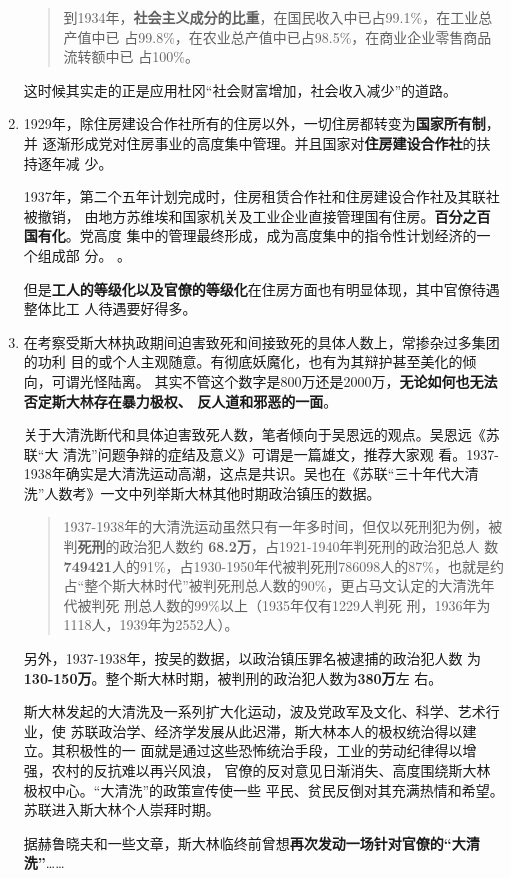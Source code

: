 \begin{enumerate}
\begin{quotation}
    到1934年，\textbf{社会主义成分的比重}，在国民收入中已占99.1\%，在工业总产值中已
    占99.8\%，在农业总产值中已占98.5\%，在商业企业零售商品流转额中已
    占100\%。
  \end{quotation}

  这时候其实走的正是应用杜冈“社会财富增加，社会收入减少”的道路。

\item 1929年，除住房建设合作社所有的住房以外，一切住房都转变为\textbf{国家所有制}，并
  逐渐形成党对住房事业的高度集中管理。并且国家对\textbf{住房建设合作社}的扶持逐年减
  少。

  1937年，第二个五年计划完成时，住房租赁合作社和住房建设合作社及其联社被撤销，
  由地方苏维埃和国家机关及工业企业直接管理国有住房。\textbf{百分之百国有化}。党高度
  集中的管理最终形成，成为高度集中的指令性计划经济的一个组成部
  分。 。

  但是\textbf{工人的等级化以及官僚的等级化}在住房方面也有明显体现，其中官僚待遇整体比工
  人待遇要好得多。

\item 在考察受斯大林执政期间迫害致死和间接致死的具体人数上，常掺杂过多集团的功利
  目的或个人主观随意。有彻底妖魔化，也有为其辩护甚至美化的倾向，可谓光怪陆离。
  其实不管这个数字是800万还是2000万，\textbf{无论如何也无法否定斯大林存在暴力极权、
    反人道和邪恶的一面}。

  关于大清洗断代和具体迫害致死人数，笔者倾向于吴恩远的观点。吴恩远《苏联“大
  清洗”问题争辩的症结及意义》\cite{wuenyuanzhengbian}可谓是一篇雄文，推荐大家观
  看。1937-1938年确实是大清洗运动高潮，这点是共识。吴也在《苏联“三十年代大清
  洗”人数考》一文中列举斯大林其他时期政治镇压的数据。
  \begin{quotation}
    1937-1938年的大清洗运动虽然只有一年多时间，但仅以死刑犯为例，被
    判\textbf{死刑}的政治犯人数约 \textbf{68.2万}，占1921-1940年判死刑的政治犯总人
    数\textbf{749421}人的91\%，占1930-1950年代被判死刑786098人的87\%，也就是约
    占“整个斯大林时代”被判死刑总人数的90\%，更占马文认定的大清洗年代被判死
    刑总人数的99\%以上（1935年仅有1229人判死
    刑，1936年为1118人，1939年为2552人）。
  \end{quotation}

  另外，1937-1938年，按吴的数据，以政治镇压罪名被逮捕的政治犯人数
  为\textbf{130-150万}。整个斯大林时期，被判刑的政治犯人数为\textbf{380万}左
  右。

  斯大林发起的大清洗及一系列扩大化运动，波及党政军及文化、科学、艺术行业，使
  苏联政治学、经济学发展从此迟滞，斯大林本人的极权统治得以建立。其积极性的一
  面就是通过这些恐怖统治手段，工业的劳动纪律得以增强，农村的反抗难以再兴风浪，
  官僚的反对意见日渐消失、高度围绕斯大林极权中心。“大清洗”的政策宣传使一些
  平民、贫民反倒对其充满热情和希望。苏联进入斯大林个人崇拜时期。

  据赫鲁晓夫和一些文章，斯大林临终前曾想\textbf{再次发动一场针对官僚的“大清洗”}……
\end{enumerate}

